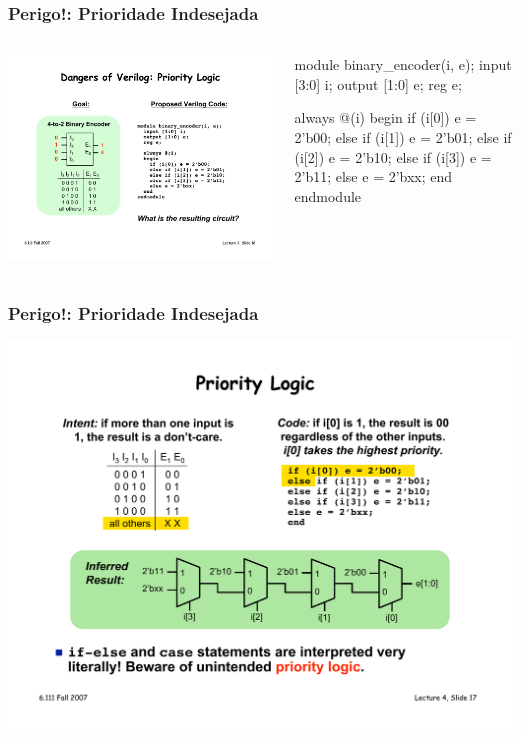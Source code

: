 \begin{frame}[fragile]
	\frametitle{Perigo!: Prioridade Indesejada}
	\begin{columns}
        \includegraphics[scale=.5]{figs/Encoder4to2}
    	\begin{verilogcode}
module binary_encoder(i, e); 
  input [3:0] i;
  output [1:0] e;
  reg e;
 
  always @(i)
  begin
    if (i[0]) 
      e = 2'b00; 
    else if (i[1]) 
      e = 2'b01; 
    else if (i[2]) 
      e = 2'b10; 
    else if (i[3]) 
      e = 2'b11; 
    else 
      e = 2'bxx;
  end
endmodule
        \end{verilogcode}
    \end{columns}
\end{frame}

\begin{frame}[fragile]
	\frametitle{Perigo!: Prioridade Indesejada}
    \includegraphics[scale=.5]{figs/Encoder4to2Pri}
\end{frame}

